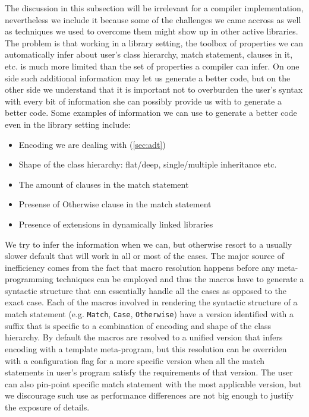 \documentclass[preprint]{sigplanconf}
\makeatletter
\DeclareRobustCommand{\code}[1]{{\lstinline[breaklines=false,escapechar=@]{#1}}}
\makeatother
\begin{document}
The discussion in this subsection will be irrelevant for a compiler 
implementation, nevertheless we include it because some of the challenges we 
came accross as well as techniques we used to overcome them might show up in 
other active libraries. The problem is that working in a library setting, the 
toolbox of properties we can automatically infer about user's class hierarchy, 
match statement, clauses in it, etc. is much more limited than the set of 
properties a compiler can infer. On one side such additional information may let 
us generate a better code, but on the other side we understand that it is 
important not to overburden the user's syntax with every bit of information she 
can possibly provide us with to generate a better code. Some examples of 
information we can use to generate a better code even in the library setting 
include:

\begin{itemize}
\item Encoding we are dealing with (\textsection\ref{sec:adt})
\item Shape of the class hierarchy: flat/deep, single/multiple inheritance etc.
\item The amount of clauses in the match statement
\item Presense of Otherwise clause in the match statement
\item Presence of extensions in dynamically linked libraries
\end{itemize}

We try to infer the information when we can, but otherwise resort to a usually 
slower default that will work in all or most of the cases. The major source of 
inefficiency comes from the fact that macro resolution happens before any 
meta-programming techniques can be employed and thus the macros have to generate 
a syntactic structure that can essentially handle all the cases as opposed to 
the exact case. Each of the macros involved in rendering the syntactic structure 
of a match statement (e.g. \code{Match}, \code{Case}, \code{Otherwise}) have a 
version identified with a suffix that is specific to a combination of encoding 
and shape of the class hierarchy. By default the macros are resolved to a 
unified version that infers encoding with a template meta-program, but this 
resolution can be overriden with a configuration flag for a more specific 
version when all the match statements in user's program satisfy the requirements 
of that version. The user can also pin-point specific match statement with the 
most applicable version, but we discourage such use as performance differences 
are not big enough to justify the exposure of details.
\end{document}
